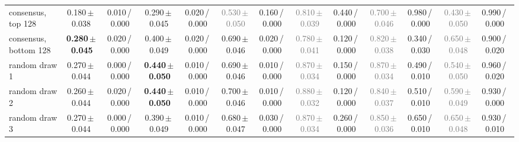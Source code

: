 \begin{tabular}{@{}lcccccccccccc@{}}
consensus, top 128 & 0.180\,{\scriptsize$\pm$\,0.038} & {\scriptsize 0.010\,/\,0.000} & 0.290\,{\scriptsize$\pm$\,0.045} & {\scriptsize 0.020\,/\,0.000} & \textcolor{gray}{0.530\,{\scriptsize$\pm$\,0.050}} & {\scriptsize 0.160\,/\,0.000} & \textcolor{gray}{0.810\,{\scriptsize$\pm$\,0.039}} & {\scriptsize 0.440\,/\,0.000} & \textcolor{gray}{0.700\,{\scriptsize$\pm$\,0.046}} & {\scriptsize 0.980\,/\,0.000} & \textcolor{gray}{0.430\,{\scriptsize$\pm$\,0.050}} & {\scriptsize 0.990\,/\,0.000} \\
consensus, bottom 128 & \textbf{0.280\,{\scriptsize$\pm$\,0.045}} & {\scriptsize 0.020\,/\,0.000} & 0.400\,{\scriptsize$\pm$\,0.049} & {\scriptsize 0.020\,/\,0.000} & 0.690\,{\scriptsize$\pm$\,0.046} & {\scriptsize 0.020\,/\,0.000} & \textcolor{gray}{0.780\,{\scriptsize$\pm$\,0.041}} & {\scriptsize 0.120\,/\,0.000} & \textcolor{gray}{0.820\,{\scriptsize$\pm$\,0.038}} & {\scriptsize 0.340\,/\,0.030} & \textcolor{gray}{0.650\,{\scriptsize$\pm$\,0.048}} & {\scriptsize 0.900\,/\,0.020} \\
\midrule
random draw 1 & 0.270\,{\scriptsize$\pm$\,0.044} & {\scriptsize 0.000\,/\,0.000} & \textbf{0.440\,{\scriptsize$\pm$\,0.050}} & {\scriptsize 0.010\,/\,0.000} & 0.690\,{\scriptsize$\pm$\,0.046} & {\scriptsize 0.010\,/\,0.000} & \textcolor{gray}{0.870\,{\scriptsize$\pm$\,0.034}} & {\scriptsize 0.150\,/\,0.000} & \textcolor{gray}{0.870\,{\scriptsize$\pm$\,0.034}} & {\scriptsize 0.490\,/\,0.010} & \textcolor{gray}{0.540\,{\scriptsize$\pm$\,0.050}} & {\scriptsize 0.960\,/\,0.020} \\
random draw 2 & 0.260\,{\scriptsize$\pm$\,0.044} & {\scriptsize 0.020\,/\,0.000} & \textbf{0.440\,{\scriptsize$\pm$\,0.050}} & {\scriptsize 0.010\,/\,0.000} & 0.700\,{\scriptsize$\pm$\,0.046} & {\scriptsize 0.010\,/\,0.000} & \textcolor{gray}{0.880\,{\scriptsize$\pm$\,0.032}} & {\scriptsize 0.120\,/\,0.000} & \textcolor{gray}{0.840\,{\scriptsize$\pm$\,0.037}} & {\scriptsize 0.510\,/\,0.010} & \textcolor{gray}{0.590\,{\scriptsize$\pm$\,0.049}} & {\scriptsize 0.930\,/\,0.000} \\
random draw 3 & 0.270\,{\scriptsize$\pm$\,0.044} & {\scriptsize 0.000\,/\,0.000} & 0.390\,{\scriptsize$\pm$\,0.049} & {\scriptsize 0.010\,/\,0.000} & 0.680\,{\scriptsize$\pm$\,0.047} & {\scriptsize 0.030\,/\,0.000} & \textcolor{gray}{0.870\,{\scriptsize$\pm$\,0.034}} & {\scriptsize 0.260\,/\,0.000} & \textcolor{gray}{0.850\,{\scriptsize$\pm$\,0.036}} & {\scriptsize 0.650\,/\,0.010} & \textcolor{gray}{0.650\,{\scriptsize$\pm$\,0.048}} & {\scriptsize 0.930\,/\,0.010} \\

\end{tabular}
